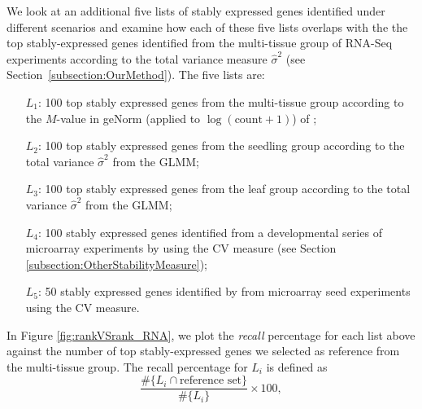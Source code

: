 \documentclass[11pt, a4paper]{article}
\begin{document}
We look at an additional five lists of stably expressed genes identified under
different scenarios and examine how each of these five lists overlaps with the
the top stably-expressed genes identified from the multi-tissue group  of
RNA-Seq experiments  according to the total variance measure $\hat\sigma^2$
(see Section~\ref{subsection:OurMethod}). 
The five lists are: 
\begin{enumerate}\label{list:L5}
    \item[$L_1$:]
 100 top stably expressed genes from the multi-tissue group according
 to the $M$-value in geNorm (applied to $\log(\text{count}+1)$) of \cite{vandesompele2002accurate} ; 
\item[$L_2$:]	
100 top stably expressed genes from the seedling group according to the total variance $\hat\sigma^2$ from the GLMM;
\item[$L_3$:]
100 top stably expressed genes from the leaf group according to the total variance $\hat\sigma^2$ from the GLMM; 
\item[$L_4$:]
100 stably expressed genes identified from a developmental series of microarray
experiments by \cite{czechowski2005genome} using the CV measure (see Section \ref{subsection:OtherStabilityMeasure}); 
\item[$L_5$:] 50 stably expressed genes identified by \cite{dekkers2012identification} from microarray
seed experiments using the CV measure.  
\end{enumerate}
In Figure \ref{fig:rankVSrank_RNA}, we plot the {\em recall} percentage for
each list above against the number of top stably-expressed genes we selected
as reference from the multi-tissue group. 
The recall percentage for $L_i$ is defined as 
\begin{equation}\label{eq:recall}
\frac{ \#	 \{L_i \cap \text{reference set} \}}{\# \{L_i\}}\times 100,
\end{equation}
\end{document}
